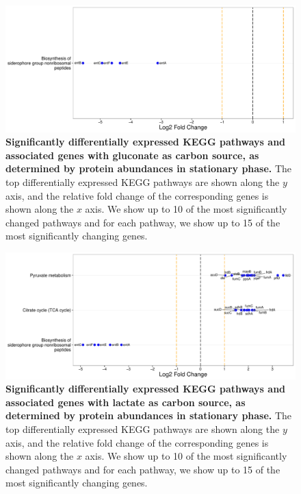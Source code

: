 \documentclass[a4paper]{article}
\begin{document}
\clearpage
\begin{figure}
	\includegraphics[width=1.0\textwidth]{../../d_figures/kegg_07.pdf}
	\caption[Significantly differentially expressed KEGG pathways for protein samples in stationary phase tested for gluconate against glucose]
	{\textbf{Significantly differentially expressed KEGG pathways and associated genes with gluconate as carbon source, as determined by protein abundances in stationary phase.} The top differentially expressed KEGG pathways are shown along the $y$ axis, and the relative fold change of the corresponding genes is shown along the $x$ axis. We show up to 10 of the most significantly changed pathways and for each pathway, we show up to 15 of the most significantly changing genes.}
\end{figure}

\clearpage
\begin{figure}
	\includegraphics[width=1.0\textwidth]{../../d_figures/kegg_08.pdf}
	\caption[Significantly differentially expressed KEGG pathways for protein samples in stationary phase tested for lactate against glucose]
	{\textbf{Significantly differentially expressed KEGG pathways and associated genes with lactate as carbon source, as determined by protein abundances in stationary phase.} The top differentially expressed KEGG pathways are shown along the $y$ axis, and the relative fold change of the corresponding genes is shown along the $x$ axis. We show up to 10 of the most significantly changed pathways and for each pathway, we show up to 15 of the most significantly changing genes.}
\end{figure}
\end{document}
